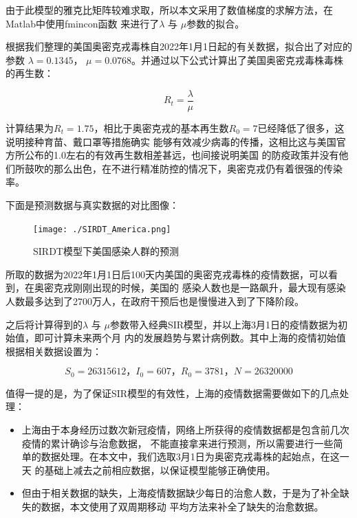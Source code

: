 \documentclass[bwprint]{gmcmthesis}
\numberwithin{figure}{section}
\begin{document}
\par 由于此模型的雅克比矩阵较难求取，所以本文采用了数值梯度的求解方法，在Matlab中使用fmincon函数
来进行了$\lambda$ 与 $\mu$参数的拟合。

\par 根据我们整理的美国奥密克戎毒株自2022年1月1日起的有关数据，拟合出了对应的参数
$\lambda = 0.1345$， $\mu = 0.0768$。并通过以下公式计算出了美国奥密克戎毒株毒株的再生数：

\begin{equation}
    R_t=\dfrac{\lambda}{\mu}
\end{equation}

\par 计算结果为$R_t=1.75$，相比于奥密克戎的基本再生数$R_0=7$已经降低了很多，这说明接种育苗、戴口罩等措施确实
能够有效减少病毒的传播，这相比这与美国官方所公布的1.0左右的有效再生数相差甚远，也间接说明美国
的防疫政策并没有他们所鼓吹的那么出色，在不进行精准防控的情况下，奥密克戎仍有着很强的传染率。
\par 下面是预测数据与真实数据的对比图像：

\begin{figure}[htbp]
    \centering
    \texttt{[image: ./SIRDT\_America.png]}
    \caption{SIRDT模型下美国感染人群的预测}
    \label{fig1}
\end{figure}

\par 所取的数据为2022年1月1日后100天内美国的奥密克戎毒株的疫情数据，可以看到，在奥密克戎刚刚出现的时候，美国的
感染人数也是一路飙升，最大现有感染人数最多达到了2700万人，在政府干预后也是慢慢进入到了下降阶段。
\par 之后将计算得到的$\lambda$ 与 $\mu$参数带入经典SIR模型，并以上海3月1日的疫情数据为初始值，即可计算未来两个月
内的发展趋势与累计病例数。其中上海的疫情初始值根据相关数据设置为：

\begin{equation}
    S_0=26315612\text{，}I_0=607\text{，}R_0=3781\text{，}N=26320000
\end{equation}


\par 值得一提的是，为了保证SIR模型的有效性，上海的疫情数据需要做如下的几点处理：
\begin{itemize}
    \item 上海由于本身经历过数次新冠疫情，网络上所获得的疫情数据都是包含前几次疫情的累计确诊与治愈数据，
不能直接拿来进行预测，所以需要进行一些简单的数据处理。在本文中，我们选取3月1日为奥密克戎毒株的起始点，在这一天
的基础上减去之前相应数据，以保证模型能够正确使用。
    \item 但由于相关数据的缺失，上海疫情数据缺少每日的治愈人数，于是为了补全缺失的数据，本文使用了双周期移动
平均方法来补全了缺失的治愈数据。
\end{itemize}
\end{document}
